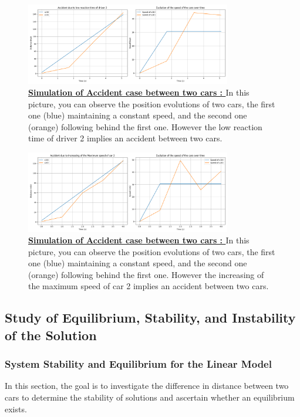 \documentclass{article}
\begin{document}
		\begin{figure}[H]
			\centering
			\includegraphics[width=0.8\textwidth]{1W2_Acc2.png}
			\caption[Simulation of Accident case between two cars]{\textbf{\underline{Simulation of Accident case between two cars : }} In this picture, you can observe the position evolutions of two cars, the first one (blue) maintaining a constant speed, and the second one (orange) following behind the first one. However the low reaction time of driver 2 implies an accident between two cars.}
			\label{fig:1W2_ACC_2}
		\end{figure}
		
		\begin{figure}[H]
			\centering
			\includegraphics[width=0.8\textwidth]{1W2_Acc3.png}
			\caption[Simulation of Accident case between two cars]{\textbf{\underline{Simulation of Accident case between two cars : }} In this picture, you can observe the position evolutions of two cars, the first one (blue) maintaining a constant speed, and the second one (orange) following behind the first one. However the increasing of the maximum speed of car 2 implies an accident between two cars.}
			\label{fig:1W2_ACC_3}
		\end{figure}
		
		
		\subsection{Study of Equilibrium, Stability, and Instability of the Solution}
		\subsubsection{System Stability and Equilibrium for the Linear Model}
		In this section, the goal is to investigate the difference in distance between two cars to determine the stability of solutions and ascertain whether an equilibrium exists.
		
\end{document}
